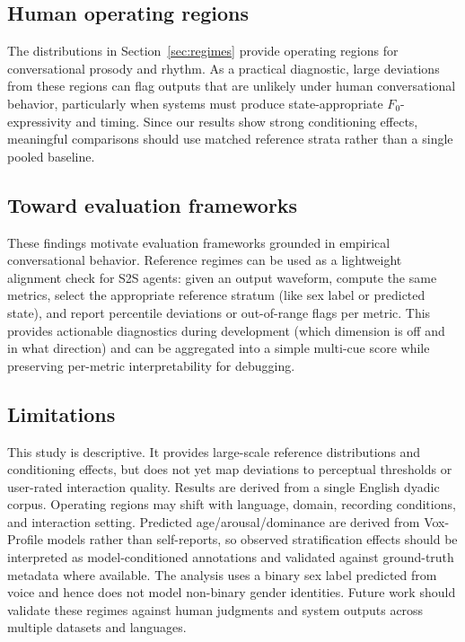 \documentclass{Interspeech}
\begin{document}
\subsection{Human operating regions}\label{sec:operating_regions}
The distributions in Section~\ref{sec:regimes} provide operating regions for conversational prosody and rhythm. 
As a practical diagnostic, large deviations from these regions can flag outputs that are unlikely under human conversational behavior, particularly when systems must produce state-appropriate $F_0$-expressivity and timing. 
Since our results show strong conditioning effects, meaningful comparisons should use matched reference strata rather than a single pooled baseline.

\subsection{Toward evaluation frameworks}\label{sec:toward_frameworks}\vspace{-2mm}
These findings motivate evaluation frameworks grounded in empirical conversational behavior. 
Reference regimes can be used as a lightweight alignment check for S2S agents: given an output waveform, compute the same metrics, select the appropriate reference stratum (like sex label or predicted state), and report percentile deviations or out-of-range flags per metric. 
This provides actionable diagnostics during development (which dimension is off and in what direction) and can be aggregated into a simple multi-cue score while preserving per-metric interpretability for debugging.

\vspace{-3mm}

\subsection{Limitations}\label{sec:limitations}\vspace{-2mm}
This study is descriptive. 
It provides large-scale reference distributions and conditioning effects, but does not yet map deviations to perceptual thresholds or user-rated interaction quality. 
Results are derived from a single English dyadic corpus. 
Operating regions may shift with language, domain, recording conditions, and interaction setting. 
Predicted age/arousal/dominance are derived from Vox-Profile models rather than self-reports, so observed stratification effects should be interpreted as model-conditioned annotations and validated against ground-truth metadata where available.
The analysis uses a binary sex label predicted from voice and hence does not model non-binary gender identities.
Future work should validate these regimes against human judgments and system outputs across multiple datasets and languages.
\end{document}
